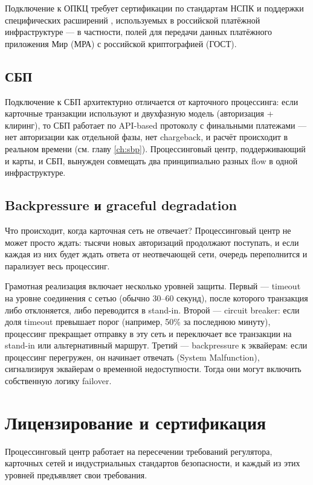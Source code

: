 Подключение к ОПКЦ требует сертификации по стандартам НСПК
и поддержки специфических расширений , используемых
в российской платёжной инфраструктуре — в частности, полей
для передачи данных платёжного приложения Мир (МРА)
с российской криптографией (ГОСТ).

\subsection*{СБП}

Подключение к СБП архитектурно отличается от карточного
процессинга: если карточные транзакции используют 
и двухфазную модель (авторизация + клиринг), то СБП работает
по API-based протоколу с финальными платежами — нет авторизации
как отдельной фазы, нет chargeback, и расчёт происходит
в реальном времени (см. главу \ref{ch:sbp}). Процессинговый
центр, поддерживающий и карты, и СБП, вынужден совмещать
два принципиально разных flow в одной инфраструктуре.

\subsection*{Backpressure и graceful degradation}

Что происходит, когда карточная сеть не отвечает? Процессинговый
центр не может просто ждать: тысячи новых авторизаций продолжают
поступать, и если каждая из них будет ждать ответа от неотвечающей
сети, очередь переполнится и парализует весь процессинг.

Грамотная реализация включает несколько уровней защиты.
Первый — timeout на уровне соединения с сетью (обычно
30--60 секунд), после которого транзакция либо отклоняется,
либо переводится в stand-in. Второй — circuit breaker:
если доля timeout превышает порог (например, 50\% за последнюю
минуту), процессинг прекращает отправку в эту сеть и переключает
все транзакции на stand-in или альтернативный маршрут.
Третий — backpressure к эквайерам: если процессинг перегружен,
он начинает отвечать  (System Malfunction), сигнализируя
эквайерам о временной недоступности. Тогда они могут включить
собственную логику failover.

\section{Лицензирование и сертификация}
\label{sec:pc-licensing}

Процессинговый центр работает на пересечении требований
регулятора, карточных сетей и индустриальных стандартов
безопасности, и каждый из этих уровней предъявляет свои
требования.

